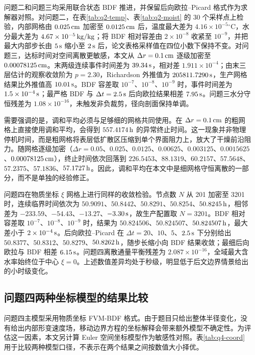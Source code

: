 \documentclass[UTF8,a4paper,12pt]{ctexart}
\numberwithin{equation}{section}
\begin{document}
问题二和问题三均采用联合状态 BDF 推进，并保留后向欧拉--Picard 格式作为求解器对照。对问题二，在表\ref{tab:q2-temp}、表\ref{tab:q2-moist} 的 30 个采样点上检验，内部网格由 $0.025\rm\,cm$ 加密至 $0.0125\rm\,cm$ 后，温度最大差为 $4.16\times10^{-5}{}^\circ\mathrm C$，水分最大差为 $4.67\times10^{-5}\rm\,kg/kg$；将 BDF 相对容差由 $2\times10^{-8}$ 收紧至 $10^{-9}$，并把最大内部步长由 $5\rm\,s$ 缩小至 $2\rm\,s$ 后，论文表格采样值在四位小数下保持不变。对问题三，达标时间对空间离散更敏感，本文从 $\Delta r=0.1\rm\,cm$ 逐级加密至 $0.00078125\rm\,cm$。末两级连续事件时间差为 $39.34\rm\,s$，相对差 $1.911\times10^{-4}$；由末三层估计的观察收敛阶为 $p=2.30$，Richardson 外推值为 $205811.7290\rm\,s$，生产网格结果比外推值高 $10.01\rm\,s$。BDF 容差取 $10^{-7}$、$10^{-8}$、$10^{-9}$ 时，事件时间差为 $1.5\times10^{-4}\rm\,s$；最严格 BDF 与 $\Delta t=2.5\rm\,s$ 后向欧拉结果相差 $7.95\rm\,s$。问题三水分守恒残差为 $1.08\times10^{-16}$，未触发非负裁剪，径向剖面保持单调。

需要强调的是，调和平均必须与足够细的网格共同使用。在 $\Delta r=0.1\rm\,cm$ 的粗网格上直接使用调和平均，会得到 $557.4174\rm\,h$ 的异常终止时间。这一现象并非物理停机时间，而是粗网格将表层低扩散区压缩到单个界面阻力上，放大了干燥前沿阻力。随网格逐级加密（$\Delta r=0.05$、$0.025$、$0.0125$、$0.00625$、$0.003125$、$0.0015625$、$0.00078125\rm\,cm$），终止时间依次回落到 $226.5453$、$88.1319$、$60.2157$、$57.5648$、$57.2375$、$57.1836$、$57.1727\rm\,h$。因此，调和平均在本文中是细网格守恒离散的一部分，而不是单独的经验修正。

问题四在物质坐标 $\xi$ 网格上进行同样的收敛检验。节点数 $N$ 从 201 加密至 3201 时，连续临界时间依次为 $50.9091$、$50.8442$、$50.8291$、$50.8254$、$50.8245\rm\,h$，相邻差为 $-233.59$、$-54.43$、$-13.27$、$-3.30\rm\,s$，故生产配置取 $N=3201$。BDF 相对容差取 $10^{-7}$、$10^{-8}$、$10^{-9}$ 时，结果为 $50.824506$、$50.824507$、$50.824507\rm\,h$，最大差小于 $2\times10^{-4}\rm\,s$。后向欧拉--Picard 在 $\Delta t=20$、$10$、$5$、$2.5\rm\,s$ 下分别给出 $50.8377$、$50.8312$、$50.8279$、$50.8262\rm\,h$，随步长缩小向 BDF 结果收敛；最细后向欧拉与 BDF 相差 $6.15\rm\,s$。问题四离散通量平衡残差为 $2.087\times10^{-16}$，全域最大含水率始终位于中心 $\xi=0$。上述数值差异均处于秒级，明显低于后文边界情景给出的小时级变化。

\subsection{问题四两种坐标模型的结果比较}
问题四主模型采用物质坐标 FVM-BDF 格式。由于题目只给出整体半径变化，没有给出内部形变速度场，移动边界方程的坐标解释会带来额外模型不确定性。为评估这一因素，本文另计算 Euler 空间坐标模型作为敏感性对照。表\ref{tab:q4-coord}用于比较两种模型口径，不表示在两个结果之间按数值大小择优。
\end{document}
